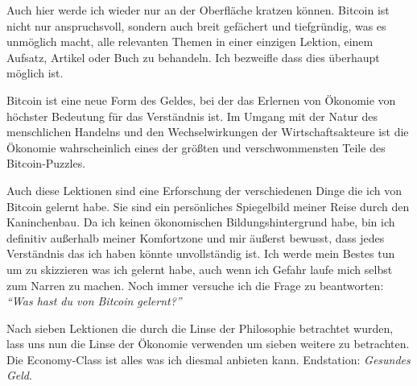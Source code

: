 Auch hier werde ich wieder nur an der Oberfläche kratzen können. Bitcoin ist
nicht nur anspruchsvoll, sondern auch breit gefächert und tiefgründig, was es
unmöglich macht, alle relevanten Themen in einer einzigen Lektion, einem
Aufsatz, Artikel oder Buch zu behandeln. Ich bezweifle dass dies überhaupt
möglich ist.

Bitcoin ist eine neue Form des Geldes, bei der das Erlernen von Ökonomie von
höchster Bedeutung für das Verständnis ist. Im Umgang mit der Natur des
menschlichen Handelns und den Wechselwirkungen der Wirtschaftsakteure ist die
Ökonomie wahrscheinlich eines der größten und verschwommensten Teile des
Bitcoin-Puzzles.

Auch diese Lektionen sind eine Erforschung der verschiedenen Dinge die ich von
Bitcoin gelernt habe. Sie sind ein persönliches Spiegelbild meiner Reise durch
den Kaninchenbau. Da ich keinen ökonomischen Bildungshintergrund habe, bin ich
definitiv außerhalb meiner Komfortzone und mir äußerst bewusst, dass jedes
Verständnis das ich haben könnte unvollständig ist. Ich werde mein Bestes tun um
zu skizzieren was ich gelernt habe, auch wenn ich Gefahr laufe mich selbst zum
Narren zu machen. Noch immer versuche ich die Frage zu beantworten:
\textit{\enquote{Was hast du von Bitcoin gelernt?}}

Nach sieben Lektionen die durch die Linse der Philosophie betrachtet wurden,
lass uns nun die Linse der Ökonomie verwenden um sieben weitere zu betrachten.
Die Economy-Class ist alles was ich diesmal anbieten kann. Endstation:
\textit{Gesundes Geld}.

